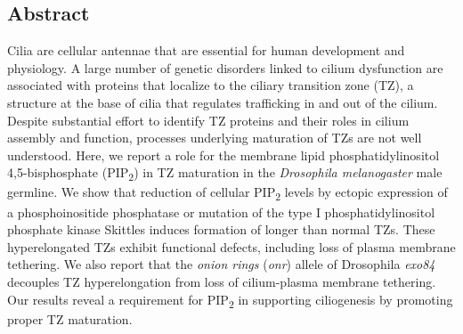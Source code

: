 \documentclass[12pt, twoside, letterpaper]{article}
\newcommand{\PIP}{PIP\textsubscript{2}}
\begin{document}
\vspace{-0.5cm}
\begin{doublespacing}
  \begin{linenumbers}
    \section*{Abstract}
    Cilia are cellular antennae that are essential for human development
    and physiology.
    A large number of genetic disorders linked to cilium dysfunction are
    associated with proteins that localize to the ciliary transition zone (TZ),
    a structure at the base of cilia that regulates trafficking in and out
    of the cilium.
    Despite substantial effort to identify TZ proteins and their roles
    in cilium assembly and function,
    processes underlying maturation of TZs are not well understood.
    Here, we report a role for the membrane lipid
    phosphatidylinositol 4,5-bisphosphate
    (\PIP{}) in TZ maturation
    in the \textit{Drosophila melanogaster} male germline.
    We show that reduction of cellular \PIP{} levels
    by ectopic expression of a phosphoinositide phosphatase
    or mutation of
    the type I phosphatidylinositol phosphate kinase Skittles
    induces formation of longer than normal TZs.
    These hyperelongated TZs exhibit functional defects,
    including loss of plasma membrane tethering.
    We also report that the \textit{onion rings} (\textit{onr}) allele
    of Drosophila \textit{exo84}
    decouples TZ hyperelongation from loss of cilium-plasma membrane tethering.
    Our results reveal a requirement for \PIP{} in supporting ciliogenesis
    by promoting proper TZ maturation.
    \newpage
    

\end{linenumbers}
\end{doublespacing}
\end{document}
